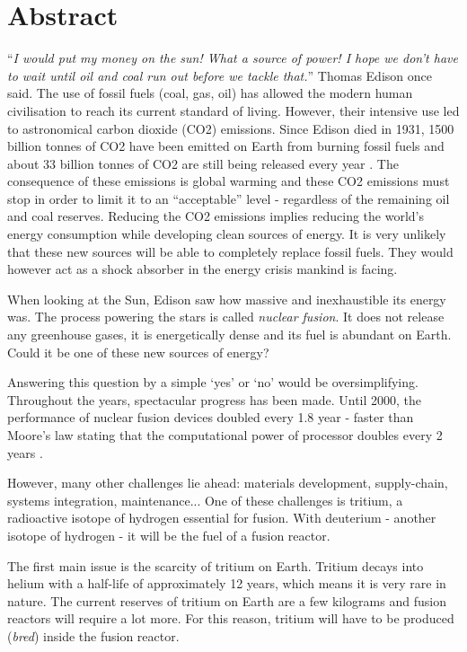 \chapter*{Abstract}

``\textit{I would put my money on the sun! What a source of power! I hope we don't have to wait until oil and coal run out before we tackle that.}'' Thomas Edison once said.
The use of fossil fuels (coal, gas, oil) has allowed the modern human civilisation to reach its current standard of living.
However, their intensive use led to astronomical carbon dioxide (CO2) emissions.
Since Edison died in 1931, 1500 billion tonnes of CO2 have been emitted on Earth from burning fossil fuels and about 33 billion tonnes of CO2 are still being released every year \cite{friedlingstein_global_2021}.
The consequence of these emissions is global warming and these CO2 emissions must stop in order to limit it to an ``acceptable'' level - regardless of the remaining oil and coal reserves.
Reducing the CO2 emissions implies reducing the world's energy consumption while developing clean sources of energy.
It is very unlikely that these new sources will be able to completely replace fossil fuels.
They would however act as a shock absorber in the energy crisis mankind is facing.

When looking at the Sun, Edison saw how massive and inexhaustible its energy was.
The process powering the stars is called \textit{nuclear fusion}.
It does not release any greenhouse gases, it is energetically dense and its fuel is abundant on Earth.
Could it be one of these new sources of energy?

Answering this question by a simple `yes' or `no' would be oversimplifying.
Throughout the years, spectacular progress has been made.
Until 2000, the performance of nuclear fusion devices doubled every 1.8 year - faster than Moore's law stating that the computational power of processor doubles every 2 years \cite{webster_fusion_2003}.

However, many other challenges lie ahead: materials development, supply-chain, systems integration, maintenance...
One of these challenges is tritium, a radioactive isotope of hydrogen essential for fusion.
With deuterium - another isotope of hydrogen - it will be the fuel of a fusion reactor.

The first main issue is the scarcity of tritium on Earth.
Tritium decays into helium with a half-life of approximately 12 years, which means it is very rare in nature.
The current reserves of tritium on Earth are a few kilograms and fusion reactors will require a lot more.
For this reason, tritium will have to be produced (\textit{bred}) inside the fusion reactor.

